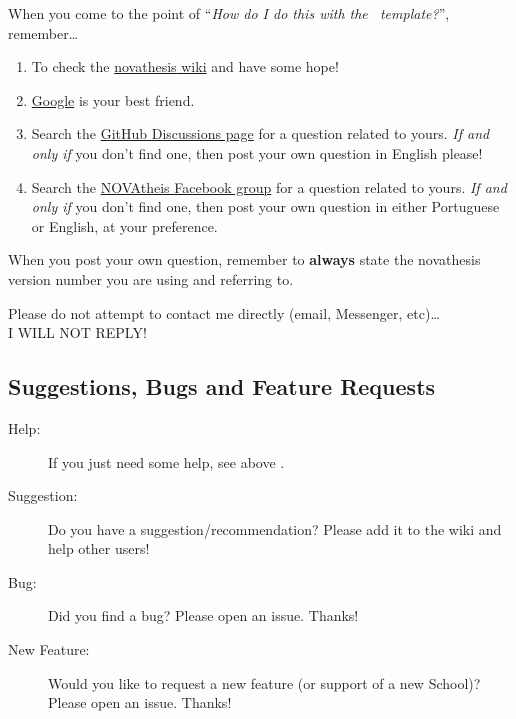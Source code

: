 When you come to the point of “\emph{How do I do this with the \novathesis\ template?}”, remember…

\begin{enumerate}
  \item To check the \href{https://github.com/joaomlourenco/novathesis/wiki}{\gls{novathesis} wiki} and have some hope!  \emojiSmile
  \item \href{https://www.google.com}{Google} is your best friend.
  \item Search the \href{https://github.com/joaomlourenco/novathesis/discussions}{GitHub Discussions page} for a question related to yours.  \emph{If and only if} you don't find one, then post your own question in English please!
  \item Search the \href{https://www.facebook.com/groups/novathesis}{NOVAtheis Facebook group} for a question related to yours.  \emph{If and only if} you don't find one, then post your own question in either Portuguese or English, at your preference.
\end{enumerate}

When you post your own question, remember to \textbf{always} state the \gls{novathesis} version number you are using and referring to.

\begin{tcolorbox}[colback=blue!8]
	\centering
Please do not attempt to contact me directly (email, Messenger, etc)…\\I WILL NOT REPLY!
\end{tcolorbox}


\subsection{Suggestions, Bugs and Feature Requests} %
\label{sub:suggestions_bugs_and_feature_requests}

\begin{description}
  \item[Help:] If you just need some help, see above .
  \item[Suggestion:] \ntindex[Suggestions]{} Do you have a suggestion/recommendation? Please add it to the wiki and help other users!
  \item[Bug:] \ntindex[Bugs]{} Did you find a bug? Please open an issue. Thanks!
  \item[New Feature:]  Would you like to request a new feature (or support of a new School)? Please open an issue. Thanks!

\end{description}



